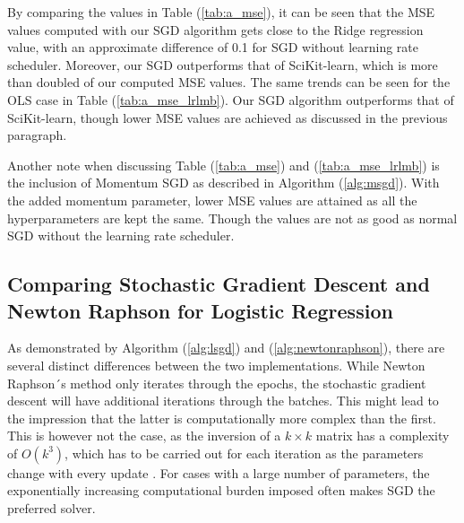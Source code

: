 \documentclass
[twocolumn,
secnumarabic,
nobibnotes,
aps,
prl,
reprint,
groupedaddress,
amsmath,
amssymb
]{revtex4-2}
\begin{document}
By comparing the values in Table (\ref{tab:a_mse}), it can be seen that
the MSE values computed with our SGD algorithm gets close to the Ridge regression value, with an approximate difference of 0.1 for SGD without learning rate scheduler. Moreover, our SGD outperforms that of SciKit-learn, which is more than doubled of our computed MSE values. The same trends can be seen for the OLS case in Table (\ref{tab:a_mse_lrlmb}). Our SGD algorithm outperforms that of SciKit-learn, though lower MSE values are achieved as discussed in the previous paragraph.

Another note when discussing Table (\ref{tab:a_mse}) and (\ref{tab:a_mse_lrlmb}) is the inclusion of Momentum SGD as described in Algorithm (\ref{alg:msgd}). With the added momentum parameter, lower MSE values are attained as all the hyperparameters are kept the same. Though the values are not as good as normal SGD without the learning rate scheduler.



\subsection{Comparing Stochastic Gradient Descent and Newton Raphson for Logistic Regression}
As demonstrated by Algorithm (\ref{alg:lsgd}) and (\ref{alg:newtonraphson}), there are several distinct differences between the two implementations. While Newton Raphson´s method only iterates through the epochs, the stochastic gradient descent will have additional iterations through the batches. This might lead to the impression that the latter is computationally more complex than the first. This is however not the case, as the inversion of a $k \times k$ matrix has a complexity of $O(k^3)$, which has to be carried out for each iteration as the parameters change with every update \cite{Goodfellow2016}. For cases with a large number of parameters, the exponentially increasing computational burden imposed often makes SGD the preferred solver.

\end{document}
